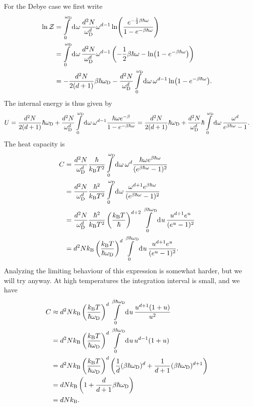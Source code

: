 For the Debye case we first write
\begin{align*}
	\ln{\mathcal{Z}} &= \int\limits_{0}^{\omega_{\text{D}}}\dd[]{\omega}\frac{d^{2}N}{\omega_{\text{D}}^{d}}\omega^{d - 1}\ln(\frac{e^{-\frac{1}{2}\beta\hbar\omega}}{1 - e^{-\beta\hbar\omega}}) \\
	        &= \int\limits_{0}^{\omega_{\text{D}}}\dd[]{\omega}\frac{d^{2}N}{\omega_{\text{D}}^{d}}\omega^{d - 1}\left(-\frac{1}{2}\beta\hbar\omega - \ln(1 - e^{-\beta\hbar\omega})\right) \\
	        &= -\frac{d^{2}N}{2(d + 1)}\beta\hbar\omega_{\text{D}} - \frac{d^{2}N}{\omega_{\text{D}}^{d}}\int\limits_{0}^{\omega_{\text{D}}}\dd[]{\omega}\omega^{d - 1}\ln(1 - e^{-\beta\hbar\omega}).
\end{align*}
The internal energy is thus given by
\begin{align*}
	U = \frac{d^{2}N}{2(d + 1)}\hbar\omega_{\text{D}} + \frac{d^{2}N}{\omega_{\text{D}}^{d}}\int\limits_{0}^{\omega_{\text{D}}}\dd[]{\omega}\omega^{d - 1}\frac{\hbar\omega e^{-\beta}}{1 - e^{-\beta\hbar\omega}} = \frac{d^{2}N}{2(d + 1)}\hbar\omega_{\text{D}} + \frac{d^{2}N}{\omega_{\text{D}}^{d}}\hbar\int\limits_{0}^{\omega_{\text{D}}}\dd[]{\omega}\frac{\omega^{d}}{e^{\beta\hbar\omega} - 1}.
\end{align*}
The heat capacity is
\begin{align*}
	C &= \frac{d^{2}N}{\omega_{\text{D}}^{d}}\frac{\hbar}{k_{\text{B}} T^{2}}\int\limits_{0}^{\omega_{\text{D}}}\dd[]{\omega}\omega^{d}\frac{\hbar\omega e^{\beta\hbar\omega}}{(e^{\beta\hbar\omega} - 1)^{2}} \\
	  &= \frac{d^{2}N}{\omega_{\text{D}}^{d}}\frac{\hbar^{2}}{k_{\text{B}} T^{2}}\int\limits_{0}^{\omega_{\text{D}}}\dd[]{\omega}\frac{\omega^{d + 1} e^{\beta\hbar\omega}}{(e^{\beta\hbar\omega} - 1)^{2}} \\
	  &= \frac{d^{2}N}{\omega_{\text{D}}^{d}}\frac{\hbar^{2}}{k_{\text{B}} T^{2}}\left(\frac{k_{\text{B}} T}{\hbar}\right)^{d + 2}\int\limits_{0}^{\beta\hbar\omega_{\text{D}}}\dd[]{u}\frac{u^{d + 1} e^{u}}{(e^{u} - 1)^{2}} \\
	  &= d^{2}Nk_{\text{B}}\left(\frac{k_{\text{B}} T}{\hbar\omega_{\text{D}}}\right)^{d}\int\limits_{0}^{\beta\hbar\omega_{\text{D}}}\dd[]{u}\frac{u^{d + 1} e^{u}}{(e^{u} - 1)^{2}}.
\end{align*}
Analyzing the limiting behaviour of this expression is somewhat harder, but we will try anyway. At high temperatures the integration interval is small, and we have
\begin{align*}
	C &\approx d^{2}Nk_{\text{B}}\left(\frac{k_{\text{B}} T}{\hbar\omega_{\text{D}}}\right)^{d}\int\limits_{0}^{\beta\hbar\omega_{\text{D}}}\dd[]{u}\frac{u^{d + 1}(1 + u)}{u^{2}} \\
	  &= d^{2}Nk_{\text{B}}\left(\frac{k_{\text{B}} T}{\hbar\omega_{\text{D}}}\right)^{d}\int\limits_{0}^{\beta\hbar\omega_{\text{D}}}\dd[]{u}u^{d - 1}(1 + u) \\
	  &= d^{2}Nk_{\text{B}}\left(\frac{k_{\text{B}} T}{\hbar\omega_{\text{D}}}\right)^{d}\left(\frac{1}{d}(\beta\hbar\omega_{\text{D}})^{d} + \frac{1}{d + 1}(\beta\hbar\omega_{\text{D}})^{d + 1}\right) \\
	  &= dNk_{\text{B}}\left(1 + \frac{d}{d + 1}\beta\hbar\omega_{\text{D}}\right) \\
	  &= dNk_{\text{B}}.
\end{align*}
